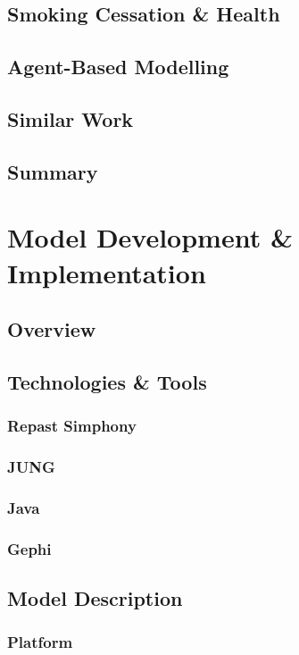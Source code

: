 \documentclass[]{report}
\begin{document}
\section{Smoking Cessation \& Health}
\section{Agent-Based Modelling}
\section{Similar Work}
\section{Summary}

%
%

%
%
\chapter{Model Development \& Implementation}
\section{Overview}

\section{Technologies \& Tools}
\subsection{Repast Simphony}
\subsection{JUNG}
\subsection{Java}
\subsection{Gephi}

\section{Model Description}
\subsection{Platform}
\end{document}
